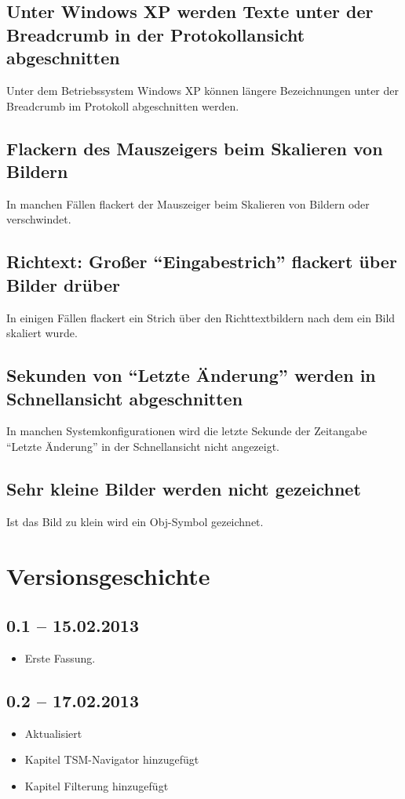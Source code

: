 \documentclass[11pt,a4paper,titlepage]{article}
\begin{document}
\subsection*{Unter Windows XP werden Texte unter der Breadcrumb in der Protokollansicht abgeschnitten}
Unter dem Betriebssystem Windows XP können längere Bezeichnungen unter der Breadcrumb im Protokoll abgeschnitten werden.

\subsection*{Flackern des Mauszeigers beim Skalieren von Bildern}
In manchen Fällen flackert der Mauszeiger beim Skalieren von Bildern oder verschwindet.

\subsection*{Richtext: Großer "`Eingabestrich"' flackert über Bilder drüber}
In einigen Fällen flackert ein Strich über den Richttextbildern nach dem ein Bild skaliert wurde.

\subsection*{Sekunden von "`Letzte Änderung"' werden in Schnellansicht abgeschnitten}
In manchen Systemkonfigurationen wird die letzte Sekunde der Zeitangabe "`Letzte Änderung"' in der Schnellansicht nicht angezeigt.

\subsection*{Sehr kleine Bilder werden nicht gezeichnet}
Ist das Bild zu klein wird ein Obj-Symbol gezeichnet.


\section{Versionsgeschichte}

\subsection*{0.1 -- 15.02.2013}
\begin{itemize}
 \item Erste Fassung.
\end{itemize}

\subsection*{0.2 -- 17.02.2013}
\begin{itemize}
 \item Aktualisiert
 \item Kapitel TSM-Navigator hinzugefügt
 \item Kapitel Filterung hinzugefügt
\end{itemize}
 
\end{document}

